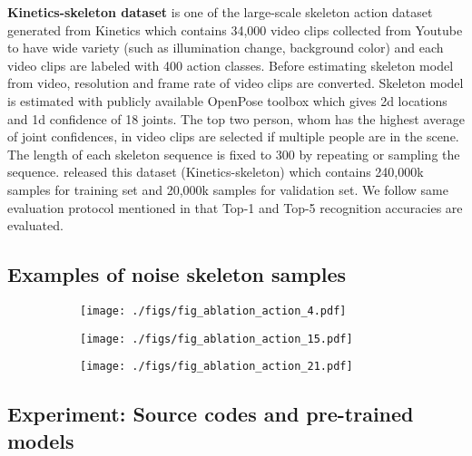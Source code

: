 \documentclass[runningheads]{llncs}
\begin{document}
\textbf{Kinetics-skeleton dataset} is one of the large-scale skeleton action dataset generated from Kinetics \cite{kay2017kinetics} which contains 34,000 video clips collected from Youtube to have wide variety (such as illumination change, background color) and each video clips are labeled with 400 action classes. Before estimating skeleton model from video, resolution and frame rate of video clips are converted. Skeleton model is estimated with publicly available OpenPose toolbox \cite{cao2017realtime} which gives 2d locations and 1d confidence of 18 joints. The top two person, whom has the highest average of joint confidences, in video clips are selected if multiple people are in the scene. The length of each skeleton sequence is fixed to 300 by repeating or sampling the sequence.  \cite{yan2018spatial} released this dataset (Kinetics-skeleton) which contains 240,000k samples for training set and 20,000k samples for validation set. We follow same evaluation protocol mentioned in \cite{yan2018spatial} that Top-1 and Top-5 recognition accuracies are evaluated.
\newpage

\subsection{Examples of noise skeleton samples}
\label{apx:3}
\begin{figure}
\vspace{-4 ex}
    \centering
\small
\begin{minipage}{\linewidth}
    \begin{subfigure}{\textwidth}
        \texttt{[image: ./figs/fig\_ablation\_action\_4.pdf]}
    \end{subfigure}
    \begin{subfigure}{\textwidth}
        \texttt{[image: ./figs/fig\_ablation\_action\_15.pdf]}
    \end{subfigure}
    \begin{subfigure}{\textwidth}
        \texttt{[image: ./figs/fig\_ablation\_action\_21.pdf]}
    \end{subfigure}
    \end{minipage}
\vspace{-6ex}
\end{figure}

\newpage


\subsection{Experiment: Source codes and pre-trained models}
\label{apx:4}
\end{document}
